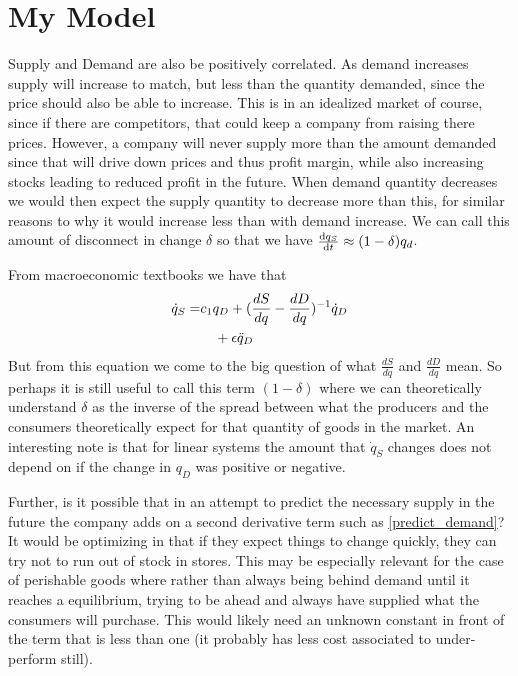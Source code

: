 \documentclass{article}
\begin{document}
\section{My Model}

Supply and Demand are also be positively correlated. As demand increases supply will increase to match, but less than the quantity demanded, since the price should also be able to increase. This is in an idealized market of course, since if there are competitors, that could keep a company from raising there prices. However, a company will never supply more than the amount demanded since that will drive down prices and thus profit margin, while also increasing stocks leading to reduced profit in the future. When demand quantity decreases we would then expect the supply quantity to decrease more than this, for similar reasons to why it would increase less than with demand increase. We can call this amount of disconnect in change $\delta$ so that we have $\frac{\mathrm{d} q_S}{\mathrm{d} t} \approx (1-\delta)q_d$.

From macroeconomic textbooks we have that 
\begin{align}
	\dot{q}_S = &  c_1 q_D + (\frac{dS}{dq} - \frac{dD}{dq})^{-1}\dot{q}_D \\
	& \ \ \ +\eps\ddot{q}_D %
\end{align}
But from this equation we come to the big question of what $\frac{dS}{dq}$ and $\frac{dD}{dq}$ mean. So perhaps it is still useful to call this term $(1-\delta)$ where we can theoretically understand $\delta$ as the inverse of the spread between what the producers and the consumers theoretically expect for that quantity of goods in the market. An interesting note is that for linear systems the amount that $\dot{q}_S$ changes does not depend on if the change in $q_D$ was positive or negative.

Further, is it possible that in an attempt to predict the necessary supply in the future the company adds on a second derivative term such as \eqref{predict_demand}? 
It would be optimizing in that if they expect things to change quickly, they can try not to run out of stock in stores. This may be especially relevant for the case of perishable goods where rather than always being behind demand until it reaches a equilibrium, trying to be ahead and always have supplied what the consumers will purchase. This would likely need an unknown constant in front of the term that is less than one (it probably has less cost associated to under-perform still). 
\end{document}
